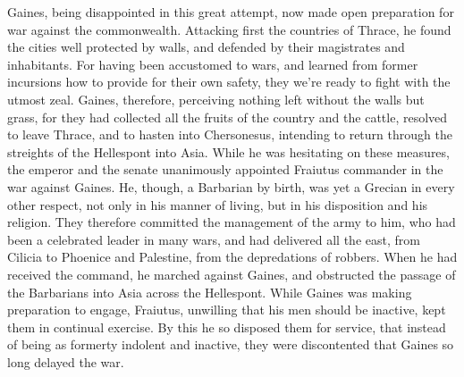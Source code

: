 Gaines, being disappointed in this great attempt, now made open preparation for war against the commonwealth. Attacking first the countries of Thrace, he found the cities well protected by walls, and defended by their magistrates and inhabitants. For having been accustomed to wars, and learned from former incursions how to provide for their own safety, they we're ready to fight with the utmost zeal. Gaines, therefore, perceiving nothing left without the walls but grass, for they had collected all the fruits of the country and the cattle, resolved to leave Thrace, and to hasten into Chersonesus, intending to return through the streights of the Hellespont into Asia. While he was hesitating on these measures, the emperor and the senate unanimously appointed Fraiutus commander in the war against Gaines. He, though, a Barbarian by birth, was yet a Grecian in every other respect, not only in his manner of living, but in his disposition and his religion. They therefore committed the management of the army to him, who had been a celebrated leader in many wars, and had delivered all the east, from Cilicia to Phoenice and Palestine, from the depredations of robbers. When he had received the command, he marched against Gaines, and obstructed the passage of the Barbarians into Asia across the Hellespont. While Gaines was making preparation to engage, Fraiutus, unwilling that his men should be inactive, kept them in continual exercise. By this he so disposed them for service, that instead of being as formerty indolent and inactive, they were discontented that Gaines so long delayed the war.

